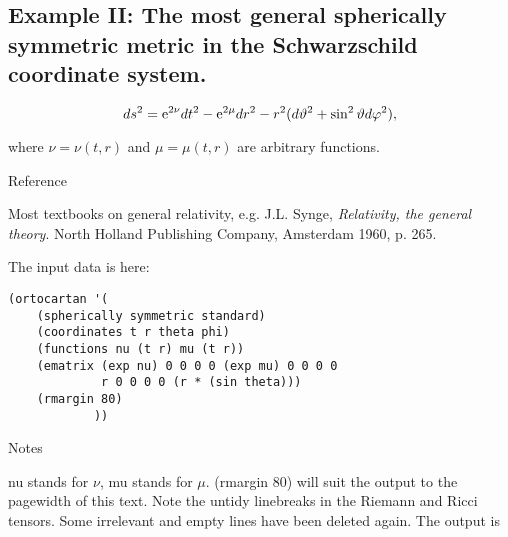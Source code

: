 \subsection{Example II: The most general spherically symmetric metric in the
Schwarzschild coordinate system.}

$$ ds^2 = {\rm e}^{2\nu} dt^2 - {\rm e}^{2\mu} dr^2 - r^2(d\vartheta^2 + \sin^2
\vartheta d\varphi^2), $$

\noindent where $\nu = \nu(t,r)$ and $\mu = \mu(t,r)$ are arbitrary functions.

\bigskip

\centerline{Reference}

Most textbooks on general relativity, e.g. J.L. Synge, {\it Relativity,  the
general theory}. North Holland Publishing Company, Amsterdam 1960, p. 265.

The input data is here:

\bigskip

\begin{verbatim}
(ortocartan '(
    (spherically symmetric standard)
    (coordinates t r theta phi)
    (functions nu (t r) mu (t r))
    (ematrix (exp nu) 0 0 0 0 (exp mu) 0 0 0 0
             r 0 0 0 0 (r * (sin theta)))
    (rmargin 80)
            ))
\end{verbatim}

\bigskip

\centerline{Notes}

nu stands for $\nu$, mu stands for $\mu$. (rmargin  80)  will suit the output
to the pagewidth of this text. Note the untidy linebreaks in the Riemann and
Ricci tensors. Some irrelevant and empty lines have been deleted again. The output is

\bigskip

